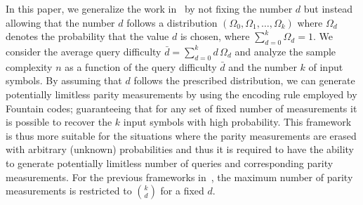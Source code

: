 \documentclass[11pt,onecolumn]{IEEEtran}
\begin{document}


In this paper, we generalize the work in~\cite{ahn2016community} by not fixing the number $d$ but instead allowing that the number $d$ follows a distribution $(\Omega_0,\Omega_1,\dots, \Omega_k)$ where $\Omega_d$ denotes the probability that the value $d$ is chosen, where $\sum_{d=0}^k \Omega_d=1$. We consider the average query difficulty $\bar{d}=\sum_{d=0}^k d\,\Omega_d$ and analyze the sample complexity $n$ as a function of the query difficulty $\bar{d}$ and the number $k$ of input symbols.
By assuming that $d$ follows the prescribed distribution, we can generate potentially limitless parity measurements by using the encoding rule employed by Fountain codes; guaranteeing that for any set of fixed number of measurements it is possible to recover the $k$ input symbols with high probability.
This framework is thus more suitable for the situations where the parity measurements are erased with arbitrary (unknown) probabilities and thus it is required to have the ability to generate potentially limitless number of queries and corresponding parity measurements. 
For the previous frameworks in~\cite{chen2016information,ahn2016community}, the maximum number of parity measurements is restricted to $k\choose d$ for a fixed $d$.
\end{document}
